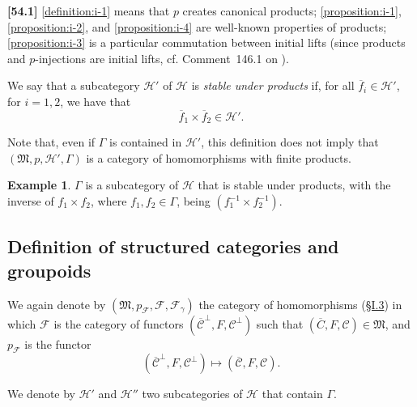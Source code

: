 \documentclass[a4paper,fleqn]{article}
\theoremstyle{plain}
\theoremstyle{definition}
\newenvironment{definition}[1]
  {\renewcommand\theinnerdefinition{#1}\innerdefinition}
  {\endinnerdefinition}
\newtheorem*{example}{Example}
\newenvironment{longcomm}[1]
  {\noindent\textbf{[#1]}\rmfamily}
  {}
\newcommand{\oldpage}[1]{{\marginpar{\footnotesize$\bigg\vert$\,\,\,\,\textit{p.~#1}}}}
\newcommand{\CC}{\mathcal{C}}
\newcommand{\HH}{\mathcal{H}}
\newcommand{\MM}{\mathfrak{M}}
\newcommand{\FF}{\mathcal{F}}
\begin{document}
\begin{longcomm}{54.1}
  \cref{definition:i-1} means that $p$ creates canonical products;
  \cref{proposition:i-1}, \cref{proposition:i-2}, and \cref{proposition:i-4} are well-known properties of products;
  \cref{proposition:i-3} is a particular commutation between initial lifts (since products and $p$-injections are initial lifts, cf. Comment~146.1 on \cite{coll66}).
\end{longcomm}

\begin{definition}{2}
\label{definition:ii-2}
  We say that a subcategory $\HH'$ of $\HH$ is \emph{stable under products} if, for all $\overline{f}_i\in\HH'$, for $i=1,2$, we have that
  \[
    \overline{f}_1\times\overline{f}_2
    \in\HH'.
  \]
\end{definition}

Note that, even if $\Gamma$ is contained in $\HH'$, this definition does not imply that $(\MM,p,\HH',\Gamma)$ is a category of homomorphisms with finite products.

\oldpage{383}
\begin{example}
  $\Gamma$ is a subcategory of $\HH$ that is stable under products, with the inverse of $f_1\times f_2$, where $f_1,f_2\in\Gamma$, being $(f_1^{-1}\times f_2^{-1})$.
\end{example}



\subsection{Definition of structured categories and groupoids}
\label{section:ii.2}

We again denote by $(\MM,p_\FF,\FF,\FF_\gamma)$ the category of homomorphisms (\hyperref[section:i.3]{§I.3}) in which $\FF$ is the category of functors $(\overline{\CC}^\perp,F,\CC^\perp)$ such that $(\overline{C},F,\CC)\in\MM$, and $p_\FF$ is the functor
\[
  (\overline{\CC}^\perp,F,\CC^\perp)
  \longmapsto (\overline{\CC},F,\CC).
\]

We denote by $\HH'$ and $\HH''$ two subcategories of $\HH$ that contain $\Gamma$.
\end{document}
